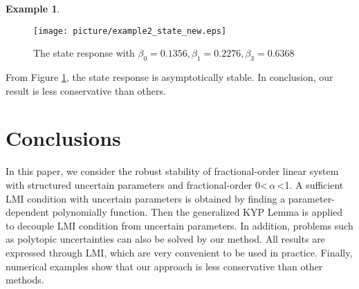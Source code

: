 \documentclass[]{interact}
\theoremstyle{plain}%
\theoremstyle{definition}
\newtheorem{example}[theorem]{Example}
\theoremstyle{remark}
\begin{document}
\begin{example}
    \begin{figure}[H]
    	\centering
    	\texttt{[image: picture/example2\_state\_new.eps]}
    	\caption{The state response with $\beta_0 = 0.1356, \beta_1 = 0.2276, \beta_3 = 0.6368$} 
    	\label{example2_state} 
    \end{figure}
    \par From Figure \ref{example2_state}, the state response is asymptotically stable. In conclusion, our result is less conservative than others.
\end{example}
\section{Conclusions}
\par In this paper, we consider the robust stability of fractional-order linear system with structured uncertain parameters and fractional-order 0\textless\,$\alpha$\,\textless1. A sufficient LMI condition with uncertain parameters is obtained by finding a parameter-dependent polynomially function. Then the generalized KYP Lemma is applied to decouple LMI condition from uncertain parameters. In addition, problems such as polytopic uncertainties can also be solved by our method. All results are expressed through LMI, which are very convenient to be used in practice. Finally, numerical examples show that our approach is less conservative than other methods.  
\end{document}
